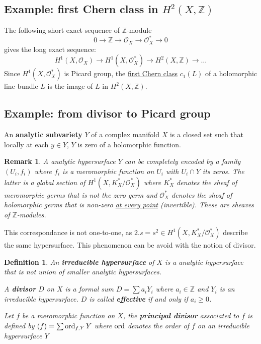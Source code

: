 \documentclass[11pt]{article}
\newtheorem{remark}{Remark}
\newtheorem{definition}{Definition}
\newcommand{\ord}{\mathop{\rm ord}\nolimits}
\begin{document}
\subsection{Example: first Chern class in \(H^2(X, \mathbb{Z})\)}
\label{sec:orgd0b07bb}
   The following short exact sequence of \(\mathbb{Z}\)-module
\[
0 \longrightarrow \mathbb{Z} \longrightarrow \mathcal{O}_X \longrightarrow \mathcal{O}_X^*
\longrightarrow 0
\]
gives the long exact sequence:
\[
H^1(X, \mathcal{O}_X) \longrightarrow H^1(X, \mathcal{O}_X^*) \longrightarrow H^2(X,
\mathbb{Z}) \longrightarrow \dots
\]
Since \(H^1(X, \mathcal{O}_X^*)\) is Picard group, the \uline{first Chern class} \(c_1(L)\) of a
holomorphic line bundle \(L\) is the image of \(L\) in \(H^2(X, \mathbb{Z})\).

\subsection{Example: from divisor to Picard group}
\label{sec:org6924367}

An \textbf{analytic subvariety} \(Y\) of a complex manifold \(X\) is a closed set such that
locally at each \(y\in Y\), \(Y\) is zero of a holomorphic function.

\begin{remark}
A analytic hypersurface \(Y\) can be completely encoded by a family \(( U_i, f_i)\)
where \(f_i\) is a meromorphic function on \(U_i\) with \(U_i\cap Y\) its zeros. The
latter is a global section of \(H^1(X, K^*_X/ \mathcal{O}^*_X)\) where \(K_X^*\)
denotes the sheaf of meromorphic germs that is not the zero germ and \(\mathcal{O}_X^*\)
denotes the sheaf of holomorphic germs that is non-zero \uline{at every point}
(invertible). These are sheaves of \(\mathbb{Z}\)-modules.
\end{remark}

This correspondance is not one-to-one, as \(2.s = s^2 \in H^1(X, K^*_X/\mathcal{O}_X^*)\) describe the same hypersurface. This phenomenon can be avoid with the notion of
divisor.

\begin{definition}
An \textbf{irreducible hypersurface} of \(X\) is a analytic hypersurface that is not union of
smaller analytic hypersurfaces.

A \textbf{divisor} \(D\) on \(X\) is a formal sum \(D = \sum a_i Y_i\) where \(a_i\in
\mathbb{Z}\) and \(Y_i\) is an irreducible hypersurface. \(D\) is called \textbf{effective}
if and only if \(a_i \geq 0\).

Let \(f\) be a meromorphic function on \(X\), the \textbf{principal divisor} associated to \(f\) is defined by \((f) = \sum \ord_{f,Y}Y\) where \(\ord\) denotes the order of \(f\) on an irreducible hypersurface \(Y\)
\end{definition}
\end{document}
